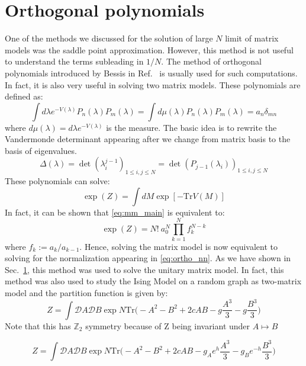\documentclass[11pt]{article}
\begin{document}
\section{\label{sec:Ortho_pol1}Orthogonal polynomials}
One of the methods we discussed for the solution of 
large $N$ limit of matrix models was the saddle point approximation. 
However, this method is not useful 
to understand the terms subleading in $1/N$. The method 
of orthogonal polynomials introduced by Bessis in Ref.~\cite{Bessis:1980ss} 
is usually used for such computations. In fact, it is also very useful in 
solving two matrix 
models. These polynomials are defined as:
\begin{equation}
	\label{eq:ortho_nn} 
	\int d\lambda e^{-V(\lambda)} P_{n}(\lambda)
	P_{m}(\lambda) = \int d \mu(\lambda) P_{n}(\lambda)
	P_{m}(\lambda) = a_{n} \delta_{mn} 
\end{equation}
where $d \mu(\lambda) = d\lambda e^{-V(\lambda)}$ is the measure. 
The basic idea is to rewrite the Vandermonde determinant appearing after we change from matrix basis to the basis of eigenvalues. 
\begin{equation}
	\Delta(\lambda) = \det(\lambda_{i}^{j-1})_{1 \le i, j \le N} = \det(P_{j-1}(\lambda_i))_{1 \le i, j \le N}
\end{equation}
These polynomials can solve:
\begin{equation}
	\label{eq:mm_main}
	\exp(Z) = \int dM \exp[-\mbox{Tr} V(M)] 
\end{equation}
In fact, it can be shown that \ref{eq:mm_main} is equivalent to:
\begin{equation}
	\exp(Z) = N! ~ a_{0}^{N} \prod_{k=1}^{N} f_{k}^{N-k}
\end{equation}
where $f_{k} := a_{k}/a_{k-1}$. 
Hence, solving the matrix model is now equivalent to solving for the 
normalization appearing in \ref{eq:ortho_nn}. As we have shown in Sec.~\ref{}, 
this method was used to solve the unitary 
matrix model. In fact, this method was also used to study the Ising Model on a random graph as two-matrix model 
\cite{Kazakov:1986hu}
and the partition function is given by:
\begin{equation}
	\label{eq:Kaz1} 
	Z = \int \mathcal{D}A \mathcal{D}B \exp N \mbox{Tr} \Bigg(-A^2 -B^2 + 2c AB -g \frac{A^3}{3} - g\frac{B^3}{3}  \Bigg)
\end{equation}
Note that this has $\mathbb{Z}_{2}$ symmetry because of 
Z being invariant under $A \mapsto B$

\begin{equation}
	\label{eq:RIsing1} 
	Z = \int \mathcal{D}A \mathcal{D}B \exp N \mbox{Tr} \Bigg(-A^2 -B^2 + 2c AB -g_{A}e^{h} \frac{A^3}{3} 
	- g_{B}e^{-h} \frac{B^3}{3}  \Bigg)
\end{equation}
\end{document}
